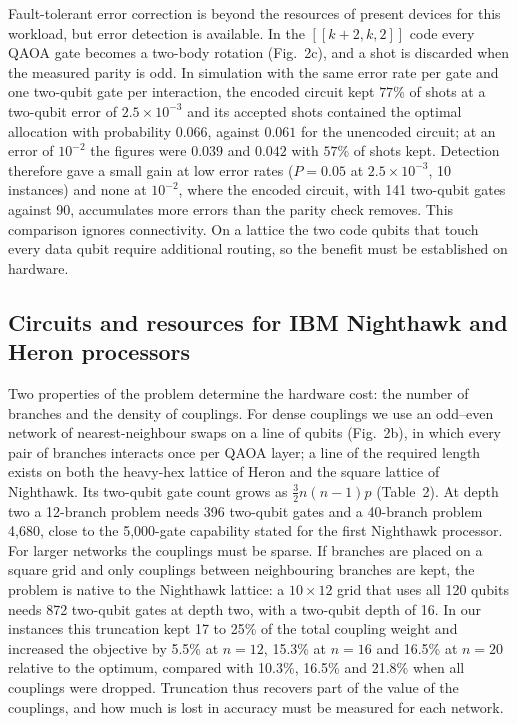 Fault-tolerant error correction is beyond the resources of present devices for this workload, but error detection is available. In the $[[k+2,k,2]]$ code\cite{self2024} every QAOA gate becomes a two-body rotation (Fig.~2c), and a shot is discarded when the measured parity is odd. In simulation with the same error rate per gate and one two-qubit gate per interaction, the encoded circuit kept $77$\% of shots at a two-qubit error of $2.5\times10^{-3}$ and its accepted shots contained the optimal allocation with probability $0.066$, against $0.061$ for the unencoded circuit; at an error of $10^{-2}$ the figures were $0.039$ and $0.042$ with $57$\% of shots kept. Detection therefore gave a small gain at low error rates ($P=0.05$ at $2.5\times10^{-3}$, 10 instances) and none at $10^{-2}$, where the encoded circuit, with 141 two-qubit gates against 90, accumulates more errors than the parity check removes. This comparison ignores connectivity. On a lattice the two code qubits that touch every data qubit require additional routing, so the benefit must be established on hardware.

\subsection*{Circuits and resources for IBM Nighthawk and Heron processors}

Two properties of the problem determine the hardware cost: the number of branches and the density of couplings. For dense couplings we use an odd--even network of nearest-neighbour swaps on a line of qubits (Fig.~2b), in which every pair of branches interacts once per QAOA layer\cite{weidenfeller2022}; a line of the required length exists on both the heavy-hex lattice of Heron and the square lattice of Nighthawk. Its two-qubit gate count grows as $\tfrac{3}{2}n(n-1)p$ (Table~2). At depth two a 12-branch problem needs 396 two-qubit gates and a 40-branch problem 4,680, close to the 5,000-gate capability stated for the first Nighthawk processor\cite{ibm2026}. For larger networks the couplings must be sparse. If branches are placed on a square grid and only couplings between neighbouring branches are kept, the problem is native to the Nighthawk lattice: a $10\times12$ grid that uses all 120 qubits needs 872 two-qubit gates at depth two, with a two-qubit depth of 16. In our instances this truncation kept 17 to 25\% of the total coupling weight and increased the objective by 5.5\% at $n=12$, 15.3\% at $n=16$ and 16.5\% at $n=20$ relative to the optimum, compared with 10.3\%, 16.5\% and 21.8\% when all couplings were dropped. Truncation thus recovers part of the value of the couplings, and how much is lost in accuracy must be measured for each network.

